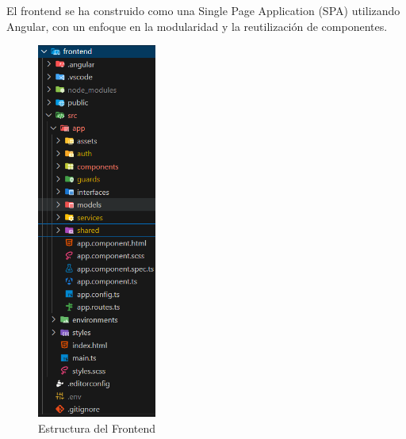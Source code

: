 El frontend se ha construido como una Single Page Application (SPA) utilizando Angular, con un enfoque en la modularidad y la reutilización de componentes.

\begin{figure}[H]
    \begin{center}
        \includegraphics[width = 0.35\textwidth]{Figuras/directoriosfrontend.png}
    \end{center}
    \caption{\label{fig:directoriosfrontend} Estructura del Frontend}
\end{figure}

\clearpage

